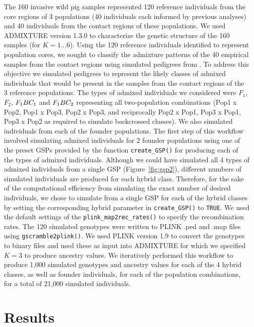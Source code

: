 {The 160 invasive wild pig samples represented 120 reference individuals from the core regions of
3 populations (40 individuals each informed by previous analyses)
and 40 individuals from the contact regions of these populations.
We used ADMIXTURE version 1.3.0 \citep{alexander2009fast} to characterize the genetic structure
of the 160 samples (for $K = {1...6}$). Using the 120 reference individuals identified to represent population cores,
we sought to classify the admixture patterns of the 40 empirical samples
from the contact regions using simulated pedigrees from \gscramble{}. To address this objective we simulated
pedigrees to represent the likely classes of admixed individuals that would be present in the samples
from the contact regions of the 3 reference populations. The types of admixed individuals we considered were
$F_1$, $F_2$, $F_{1}BC_1$ and $F_{1}BC_2$ representing all two-population combinations
(Pop1 x Pop2, Pop1 x Pop3, Pop2 x Pop3, and reciprocally Pop2 x Pop1, Pop3 x Pop1, Pop3 x Pop2 as required
to simulate backcrossed classes).
We also simulated individuals from each of the founder populations. The first step of this workflow involved
simulating admixed individuals for 2 founder populations using one of the preset \gscramble{}
GSPs provided by the function {\footnotesize\tt create\_GSP()} for producing each of the types of admixed
individuals. Although we could have simulated all 4 types of admixed individuals from a single GSP (Figure~\ref{fig:gsp2}),
different numbers of simulated individuals are produced for each hybrid class. Therefore, for the sake of the
computational efficiency from simulating the exact number of desired individuals, we chose to simulate from
a single GSP for each of the hybrid classes by setting the corresponding hybrid parameter in {\footnotesize\tt create\_GSP()} to {\footnotesize\tt TRUE}. We used the default settings of the {\footnotesize\tt plink\_map2rec\_rates()} to specify the recombination rates. The 120 simulated genotypes were written to PLINK .ped and .map files using {\footnotesize\tt gscramble2plink()}. We used PLINK version 1.9 \citep{purcell2007plink} to convert the genotypes to binary files and used these as input into ADMIXTURE for which we specified $K=3$ to produce ancestry values. We iteratively
performed this workflow to produce 1,000 simulated genotypes and ancestry values for each of the
4 hybrid classes, as well as founder individuals, for each of the population combinations, for a total of
21,000 simulated individuals.

\section*{Results}

}
